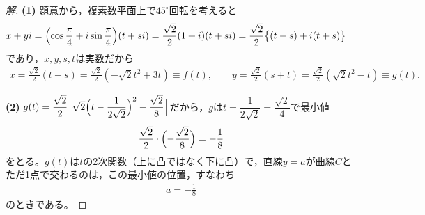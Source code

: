\documentclass[../main.tex]{subfiles}
\begin{document}
\begin{proof}[解]
  \textbf{(1)} 題意から，複素数平面上で$45^\circ$回転を考えると
  \begin{align*}
    x+yi&=\Bigl(\cos\frac\pi4+i\sin\frac\pi4\Bigr)(t+si)=\frac{\sqrt2}2(1+i)(t+si)=\frac{\sqrt2}2\bigl\{(t-s)+i(t+s)\bigr\}
  \end{align*}
  であり，$x,y,s,t$は実数だから
  \begin{align*}
    x=\frac{\sqrt2}2(t-s)=\frac{\sqrt2}2(-\sqrt2t^2+3t)\equiv f(t),\qquad
    y=\frac{\sqrt2}2(s+t)=\frac{\sqrt2}2(\sqrt2t^2-t)\equiv g(t).
  \end{align*}

  \textbf{(2)} $g(t)=\dfrac{\sqrt2}2\Bigl[\sqrt2\Bigl(t-\dfrac1{2\sqrt2}\Bigr)^2-\dfrac{\sqrt2}8\Bigr]$だから，$g$は$t=\dfrac1{2\sqrt2}=\dfrac{\sqrt2}4$で最小値
  \begin{align*}
    \frac{\sqrt2}2\cdot\Bigl(-\frac{\sqrt2}8\Bigr)=-\frac18
  \end{align*}
  をとる。$g(t)$は$t$の2次関数（上に凸ではなく下に凸）で，直線$y=a$が曲線$C$とただ1点で交わるのは，この最小値の位置，すなわち
  \begin{align*}
    a=-\frac18
  \end{align*}
  のときである。


\end{proof}
\end{document}
